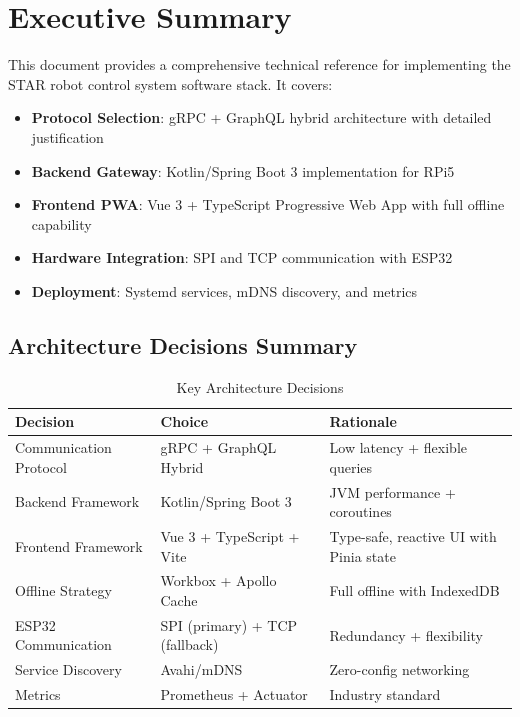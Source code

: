 \section{Executive Summary}

This document provides a comprehensive technical reference for implementing the STAR robot control system software stack. It covers:

\begin{itemize}
    \item \textbf{Protocol Selection}: gRPC + GraphQL hybrid architecture with detailed justification
    \item \textbf{Backend Gateway}: Kotlin/Spring Boot 3 implementation for RPi5
    \item \textbf{Frontend PWA}: Vue 3 + TypeScript Progressive Web App with full offline capability
    \item \textbf{Hardware Integration}: SPI and TCP communication with ESP32
    \item \textbf{Deployment}: Systemd services, mDNS discovery, and metrics
\end{itemize}

\subsection{Architecture Decisions Summary}

\begin{table}[H]
\centering
\begin{tabular}{|l|l|l|}
\hline
\textbf{Decision} & \textbf{Choice} & \textbf{Rationale} \\
\hline
Communication Protocol & gRPC + GraphQL Hybrid & Low latency + flexible queries \\
Backend Framework & Kotlin/Spring Boot 3 & JVM performance + coroutines \\
Frontend Framework & Vue 3 + TypeScript + Vite & Type-safe, reactive UI with Pinia state \\
Offline Strategy & Workbox + Apollo Cache & Full offline with IndexedDB \\
ESP32 Communication & SPI (primary) + TCP (fallback) & Redundancy + flexibility \\
Service Discovery & Avahi/mDNS & Zero-config networking \\
Metrics & Prometheus + Actuator & Industry standard \\
\hline
\end{tabular}
\caption{Key Architecture Decisions}
\end{table}

